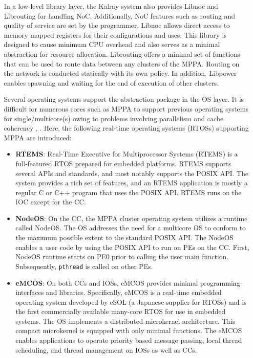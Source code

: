 In a low-level library layer, the Kalray system also provides Libnoc and Librouting for handling NoC.
Additionally, NoC features such as routing and quality of service are set by the programmer.
Libnoc allows direct access to memory mapped registers for their configurations and uses.
This library is designed to cause minimum CPU overhead and also serves as a minimal abstraction for resource allocation.
Librouting offers a minimal set of functions that can be used to route data between any clusters of the MPPA.
Routing on the network is conducted statically with its own policy.
In addition, Libpower enables spawning and waiting for the end of execution of other clusters.


Several operating systems support the abstraction package in the OS layer.
It is difficult for numerous cores such as MPPA to support previous operating systems for single/multicore(s) owing to problems involving parallelism and cache coherency \cite{Wentzlaff2009FOS}, \cite{schupbach2008embracing}.
Here, the following real-time operating systems (RTOSs) supporting MPPA are introduced:

\begin{itemize}
  \setlength{\leftskip}{-5mm}    
  \item \textbf{RTEMS}: Real-Time Executive for Multiprocessor Systems (RTEMS) is a full-featured RTOS prepared for embedded platforms.
  RTEMS supports several APIs and standards, and most notably supports the POSIX API.
  The system provides a rich set of features, and an RTEMS application is mostly a regular C or C++ program that uses the POSIX API.
  RTEMS runs on the IOC except for the CC.
  
  \item \textbf{NodeOS}: On the CC, the MPPA cluster operating system utilizes a runtime called NodeOS.
  The OS addresses the need for a multicore OS to conform to the maximum possible extent to the standard POSIX API.
  The NodeOS enables a user code by using the POSIX API to run on PEs on the CC.
  First, NodeOS runtime starts on PE0 prior to calling the user main function.
  Subsequently, \texttt{pthread} is called on other PEs.
  
  \item \textbf{eMCOS}: On both CCs and IOSs, eMCOS provides minimal programming interfaces and libraries.
  Specifically, eMCOS is a real-time embedded operating system developed by eSOL (a Japanese supplier for RTOSs) and is the first commercially available many-core RTOS for use in embedded systems.
  The OS implements a distributed microkernel architecture.
  This compact microkernel is equipped with only minimal functions.
  The eMCOS enables applications to operate priority based message passing, local thread scheduling, and thread management on IOSs as well as CCs.
\end{itemize}

